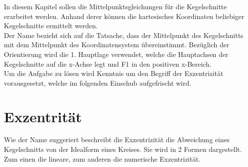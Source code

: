 \setcounter{section}{0}
In diesem Kapitel sollen die Mittelpunktsgleichungen für die Kegelschnitte erarbeitet werden. Anhand derer können die kartesisches Koordinaten beliebiger Kegelschnitte ermittelt werden.\\
Der Name bezieht sich auf die Tatsache, dass der Mittelpunkt des Kegelschnitts mit dem Mittelpunkt des Koordinatensystem übereinstimmt. Bezüglich der Orientierung wird die 1. Hauptlage verwendet, welche die Hauptachsen der Kegelschnitte auf die x-Achse legt und F1 in den positiven x-Bereich.\\
Um die Aufgabe zu lösen wird Kenntnis um den Begriff der Exzentrizität vorausgesetzt, welche im folgenden Einschub aufgefrischt wird.
\section{Exzentrität}
Wie der Name suggeriert beschreibt die Exzentrizität die Abweichung eines Kegelschnitts von der Idealform eines Kreises. Sie wird in 2 Formen dargestellt. Zum einen die lineare, zum anderen die numerische Exzentrizität.
